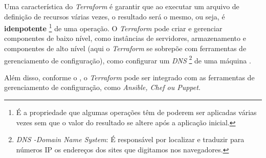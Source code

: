 Uma característica do \textit{Terraform} é garantir que ao executar um arquivo de definição de recursos várias vezes, o resultado será o mesmo, ou seja, é \textbf{idenpotente} \footnote{É a propriedade que algumas operações têm de poderem ser aplicadas várias vezes sem que o valor do resultado se altere após a aplicação inicial.} de uma operação. O \textit{Terraform} pode criar e gerenciar componentes de baixo nível, como instâncias de servidores, armazenamento e componentes de alto nível (aqui o \textit{Terraform} se sobrepõe com ferramentas de gerenciamento de configuração), como configurar um \textit{DNS} \footnote{\textit{DNS -Domain Name System}: É responsável por localizar e traduzir para números IP os endereços dos sites que digitamos nos navegadores.} de uma máquina \cite{brikman2017terraform}.

Além disso, conforme o , o \textit{Terraform} pode ser integrado com as ferramentas de gerenciamento de configuração, como \textit{Ansible, Chef ou Puppet}.

